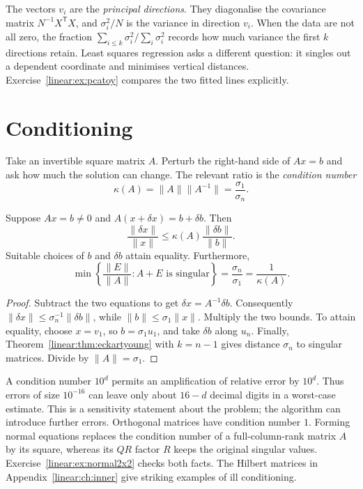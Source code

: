 The vectors $v_i$ are the \emph{principal directions}. They diagonalise the covariance matrix $N^{-1}X^{\mathsf T}X$, and $\sigma_i^2/N$ is the variance in direction $v_i$. When the data are not all zero, the fraction $\sum_{i\le k}\sigma_i^2/\sum_i\sigma_i^2$ records how much variance the first $k$ directions retain. Least squares regression asks a different question: it singles out a dependent coordinate and minimises vertical distances. Exercise~\ref{linear:ex:pcatoy} compares the two fitted lines explicitly.

\section{Conditioning}

Take an invertible square matrix $A$. Perturb the right-hand side of $Ax=b$ and ask how much the solution can change. The relevant ratio is the \emph{condition number}
\[
\kappa(A)=\|A\|\|A^{-1}\|=\frac{\sigma_1}{\sigma_n}.
\]

\begin{proposition}\label{linear:prop:condition}
Suppose $Ax=b\ne0$ and $A(x+\delta x)=b+\delta b$. Then
\[
\frac{\|\delta x\|}{\|x\|}\le\kappa(A)\frac{\|\delta b\|}{\|b\|}.
\]
Suitable choices of $b$ and $\delta b$ attain equality. Furthermore,
\[
\min\left\{\frac{\|E\|}{\|A\|}: A+E\text{ is singular}\right\}=\frac{\sigma_n}{\sigma_1}=\frac1{\kappa(A)}.
\]
\end{proposition}
\begin{proof}
Subtract the two equations to get $\delta x=A^{-1}\delta b$. Consequently $\|\delta x\|\le\sigma_n^{-1}\|\delta b\|$, while $\|b\|\le\sigma_1\|x\|$. Multiply the two bounds. To attain equality, choose $x=v_1$, so $b=\sigma_1u_1$, and take $\delta b$ along $u_n$. Finally, Theorem~\ref{linear:thm:eckartyoung} with $k=n-1$ gives distance $\sigma_n$ to singular matrices. Divide by $\|A\|=\sigma_1$.
\end{proof}

A condition number $10^d$ permits an amplification of relative error by $10^d$. Thus errors of size $10^{-16}$ can leave only about $16-d$ decimal digits in a worst-case estimate. This is a sensitivity statement about the problem; the algorithm can introduce further errors. Orthogonal matrices have condition number $1$. Forming normal equations replaces the condition number of a full-column-rank matrix $A$ by its square, whereas its $QR$ factor $R$ keeps the original singular values. Exercise~\ref{linear:ex:normal2x2} checks both facts. The Hilbert matrices in Appendix~\ref{linear:ch:inner} give striking examples of ill conditioning.


